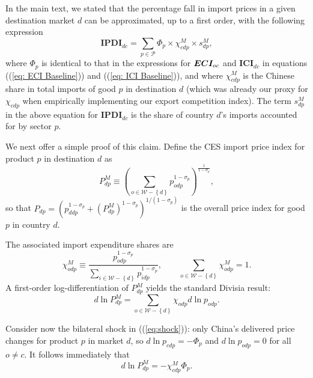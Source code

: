 \documentclass[english,12pt]{article}
\theoremstyle{definition}
\let\oldref\ref
\renewcommand{\ref}[1]{(\oldref{#1})}
\begin{document}
In the main text, we stated that the percentage fall in import prices in a
given destination market $d$ can be approximated, up to a first order, with
the following expression%
\begin{equation*}
\boldsymbol{IPDI}_{dc}=\sum_{p\in \mathcal{P}}\Phi _{p}\times \chi
_{cdp}^{M}\times s_{dp}^{M},
\end{equation*}%
where $\Phi _{p}$ is identical to that in the expressions for $\boldsymbol{%
ECI}_{oc}$ and $\boldsymbol{ICI}_{dc}$ in equations (\ref{eq: ECI Baseline})
and (\ref{eq: ICI Baseline}), and where $\chi _{cdp}^{M}$ is the Chinese
share in total imports of good $p$ in destination $d$ (which was already our
proxy for $\chi _{cdp}$ when empirically implementing our export competition
index). The term $s_{dp}^{M}$ in the above equation for $\boldsymbol{IPDI}%
_{dc}$ is the share of country $d$'s imports accounted for by sector $p$.

We next offer a simple proof of this claim. Define the CES import price
index for product $p$ in destination $d$ as 
\begin{equation*}
P_{dp}^{M}\equiv \left( \sum_{o\in \mathcal{W-}\left\{ d\right\}
}p_{odp}^{1-\sigma _{p}}\right) ^{\frac{1}{1-\sigma _{p}}},
\end{equation*}%
so that $P_{dp}=\left( p_{ddp}^{1-\sigma _{p}}+\left( P_{dp}^{M}\right)
^{1-\sigma _{p}}\right) ^{1/\left( 1-\sigma _{p}\right) }$ is the overall
price index for good $p$ in country $d$.

The associated import expenditure shares are 
\begin{equation*}
\chi _{odp}^{M}\equiv \frac{p_{odp}^{1-\sigma _{p}}}{\sum_{i\in \mathcal{W-}%
\left\{ d\right\} }p_{idp}^{1-\sigma _{p}}},\qquad \sum_{o\in \mathcal{W-}%
\left\{ d\right\} }\chi _{odp}^{M}=1.
\end{equation*}%
A first-order log-differentiation of $P_{dp}^{M}$ yields the standard
Divisia result: 
\begin{equation*}
d\ln P_{dp}^{M}=\sum_{o\in \mathcal{W-}\left\{ d\right\} }\chi _{odp}d\ln
p_{odp}.
\end{equation*}

Consider now the bilateral shock in (\ref{eq:shock}): only China's delivered
price changes for product $p$ in market $d$, so $d\ln p_{cdp}=-\Phi _{p}$
and $d\ln p_{odp}=0$ for all $o\neq c$. It follows immediately that 
\begin{equation*}
d\ln P_{dp}^{M}=-\chi _{cdp}^{M}\Phi _{p}.
\end{equation*}
\end{document}
